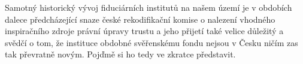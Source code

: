 \documentclass{article}
\begin{document}
Samotný historický vývoj fiduciárních institutů na našem území je v obdobích dalece předcházející snaze české rekodifikační komise o nalezení vhodného inspiračního zdroje právní úpravy trustu a jeho přijetí také velice důležitý a svědčí o tom, že instituce obdobné svěřenskému fondu nejsou v Česku ničím zas tak převratně novým. Pojďmě si ho tedy ve zkratce představit.

 
 
 



\end{document}
